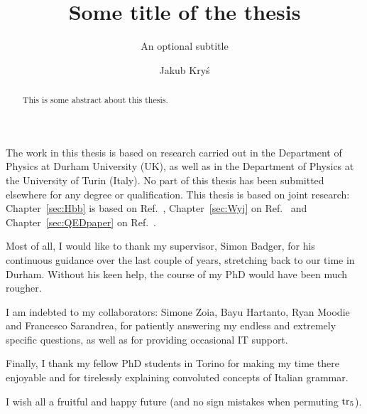 \documentclass[twoside,frontopenright,halfspacing, openany]{ip3thesis}
\begin{document}
\title{Some title of the thesis}
\subtitle{An optional subtitle}
\author{Jakub Kry\'s}
\maketitlepage*

\begin{abstract}
%
	This is some abstract about this thesis.
%
\end{abstract}

\disableprotrusion
\tableofcontents*
\enableprotrusion

\begin{declaration*}
%
	The work in this thesis is based on research carried out in the Department of
	Physics at Durham University (UK), as well as in the Department of Physics at the University of Turin (Italy). No part of this thesis has been submitted elsewhere for any degree or qualification. This thesis is based on joint research: Chapter~\ref{sec:Hbb} is based on Ref.~\cite{Badger:2021ega}, Chapter~\ref{sec:Wyj} on Ref.~\cite{Badger:2022ncb} and Chapter~\ref{sec:QEDpaper} on Ref.~\cite{Badger:2023xtl}.
%
\end{declaration*}

\begin{acknowledgements*}
%
	Most of all, I would like to thank my supervisor, Simon Badger, for his continuous guidance over the last couple of years, stretching back to our time in Durham. Without his keen help, the course of my PhD would have been much rougher.
 
    I am indebted to my collaborators: Simone Zoia, Bayu Hartanto, Ryan Moodie and Francesco Sarandrea, for patiently answering my endless and extremely specific questions, as well as for providing occasional IT support.
    
    Finally, I thank my fellow PhD students in Torino for making my time there enjoyable and for tirelessly explaining convoluted concepts of Italian grammar.
    
    I wish all a fruitful and happy future (and no sign mistakes when permuting $\operatorname{\rm tr}_5$).
%
\end{acknowledgements*}

\end{document}
